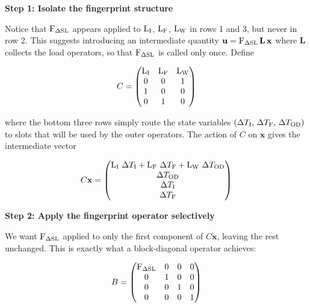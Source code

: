 \textbf{Step 1: Isolate the fingerprint structure}

Notice that $\operatorname{{F}}_{{\Delta \mathrm{SL}}}$ appears applied to $\operatorname{{L}}_{{\text{I}}}$, $\operatorname{{L}}_{{\text{F}}}$, $\operatorname{{L}}_{{\text{W}}}$
in rows 1 and 3, but never in row 2. This suggests introducing an intermediate quantity
$\mathbf{u} = \operatorname{{F}}_{{\Delta \mathrm{SL}}}\mathbf{L}\,\mathbf{x}$ where $\mathbf{L}$ collects the load operators,
so that $\operatorname{{F}}_{{\Delta \mathrm{SL}}}$ is called only once. Define

\begin{equation}
    C = \begin{pmatrix}
        \operatorname{{L}}_{{\text{I}}} & \operatorname{{L}}_{{\text{F}}} & \operatorname{{L}}_{{\text{W}}} \\
        0 & 0 & 1 \\
        1 & 0 & 0 \\
        0 & 1 & 0
    \end{pmatrix}
\end{equation}

where the bottom three rows simply route the state variables
$\left(\Delta T_\text{I},\, \Delta T_\text{F},\, \Delta T_\text{OD}\right)$ to slots that will be
used by the outer operators. The action of $C$ on $\mathbf{x}$ gives the intermediate vector

\begin{equation}
    C\mathbf{x} = \begin{pmatrix}
        \operatorname{{L}}_{{\text{I}}}\,\Delta T_\text{I} + \operatorname{{L}}_{{\text{F}}}\,\Delta T_\text{F} + \operatorname{{L}}_{{\text{W}}}\,\Delta T_\text{OD} \\
        \Delta T_\text{OD} \\
        \Delta T_\text{I} \\
        \Delta T_\text{F}
    \end{pmatrix}
\end{equation}

\textbf{Step 2: Apply the fingerprint operator selectively}

We want $\operatorname{{F}}_{{\Delta \mathrm{SL}}}$ applied to only the first component of $C\mathbf{x}$, leaving the rest
unchanged. This is exactly what a block-diagonal operator achieves:

\begin{equation}
    B = \begin{pmatrix}
        \operatorname{{F}}_{{\Delta \mathrm{SL}}} & 0 & 0 & 0 \\
        0 & 1 & 0 & 0 \\
        0 & 0 & 1 & 0 \\
        0 & 0 & 0 & 1
    \end{pmatrix}
\end{equation}

